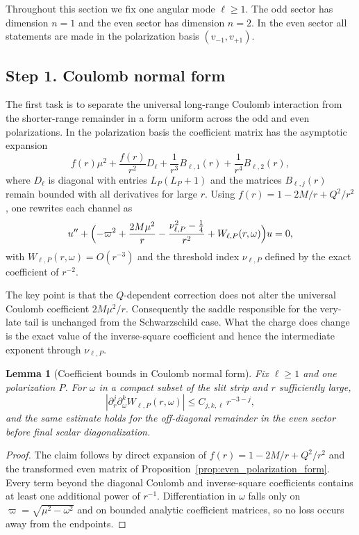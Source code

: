 \documentclass[12pt]{article}
\numberwithin{equation}{section}
\theoremstyle{plain}
\newtheorem{lemma}[theorem]{Lemma}
\theoremstyle{definition}
\theoremstyle{remark}
\newcommand{\om}{\omega}
\newcommand{\vp}{\varpi}
\newcommand{\abs}[1]{\left|#1\right|}
\begin{document}
Throughout this section we fix one angular mode $\ell\ge1$.  The odd sector has dimension $n=1$ and the even sector has dimension $n=2$.  In the even sector all statements are made in the polarization basis $(v_{-1},v_{+1})$.

\subsection*{Step 1. Coulomb normal form}

The first task is to separate the universal long-range Coulomb interaction from the shorter-range remainder in a form uniform across the odd and even polarizations.  In the polarization basis the coefficient matrix has the asymptotic expansion
\[
   f(r)\mu^2+\frac{f(r)}{r^2}D_\ell+\frac{1}{r^3}B_{\ell,1}(r)+\frac{1}{r^4}B_{\ell,2}(r),
\]
where $D_\ell$ is diagonal with entries $L_P(L_P+1)$ and the matrices $B_{\ell,j}(r)$ remain bounded with all derivatives for large $r$.  Using $f(r)=1-2M/r+Q^2/r^2$, one rewrites each channel as
\begin{equation}\label{eq:step1_coulomb_model}
   u''+\Bigl(
      -\vp^2+\frac{2M\mu^2}{r}-\frac{\nu_{\ell,P}^2-\frac14}{r^2}
      +W_{\ell,P}(r,\om)
   \Bigr)u=0,
\end{equation}
with $W_{\ell,P}(r,\om)=O(r^{-3})$ and the threshold index $\nu_{\ell,P}$ defined by the exact coefficient of $r^{-2}$.

The key point is that the $Q$-dependent correction does not alter the universal Coulomb coefficient $2M\mu^2/r$.  Consequently the saddle responsible for the very-late tail is unchanged from the Schwarzschild case.  What the charge does change is the exact value of the inverse-square coefficient and hence the intermediate exponent through $\nu_{\ell,P}$.

\begin{lemma}[Coefficient bounds in Coulomb normal form]\label{lem:coulomb_bounds}
Fix $\ell\ge1$ and one polarization $P$.  For $\om$ in a compact subset of the slit strip and $r$ sufficiently large,
\[
   \abs{\partial_r^j\partial_\om^k W_{\ell,P}(r,\om)}
   \le C_{j,k,\ell}\,r^{-3-j},
\]
and the same estimate holds for the off-diagonal remainder in the even sector before final scalar diagonalization.
\end{lemma}

\begin{proof}
The claim follows by direct expansion of $f(r)=1-2M/r+Q^2/r^2$ and the transformed even matrix of Proposition~\ref{prop:even_polarization_form}.  Every term beyond the diagonal Coulomb and inverse-square coefficients contains at least one additional power of $r^{-1}$.  Differentiation in $\om$ falls only on $\vp=\sqrt{\mu^2-\om^2}$ and on bounded analytic coefficient matrices, so no loss occurs away from the endpoints.
\end{proof}
\end{document}
